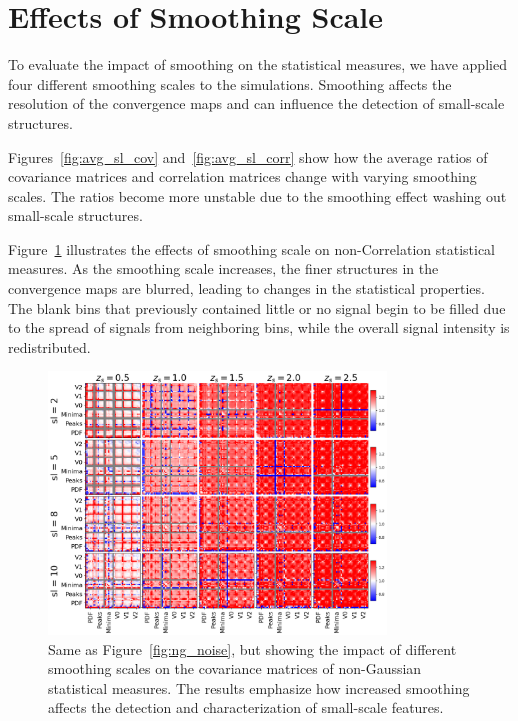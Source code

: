 \section{Effects of Smoothing Scale}
To evaluate the impact of smoothing on the statistical measures, we have applied four different smoothing scales to the simulations. Smoothing affects the resolution of the convergence maps and can influence the detection of small-scale structures.

Figures~\ref{fig:avg_sl_cov} and~\ref{fig:avg_sl_corr} show how the average ratios of covariance matrices and correlation matrices change with varying smoothing scales. The ratios become more unstable due to the smoothing effect washing out small-scale structures.

Figure~\ref{fig:ng_smoothing} illustrates the effects of smoothing scale on non-Correlation statistical measures. As the smoothing scale increases, the finer structures in the convergence maps are blurred, leading to changes in the statistical properties. The blank bins that previously contained little or no signal begin to be filled due to the spread of signals from neighboring bins, while the overall signal intensity is redistributed.

\begin{figure}[ht]
    \centering
    \includegraphics[width=0.8\textwidth]{figures/results/nongaussian_cov_sl.png}
    \caption[BIGBOX/TILED Ratio of Covariance Matricies for multiple smoothing scales: Non-Gaussian Statistics]{Same as Figure~\ref{fig:ng_noise}, but showing the impact of different smoothing scales on the covariance matrices of non-Gaussian statistical measures. The results emphasize how increased smoothing affects the detection and characterization of small-scale features.}
    \label{fig:ng_smoothing}
\end{figure}